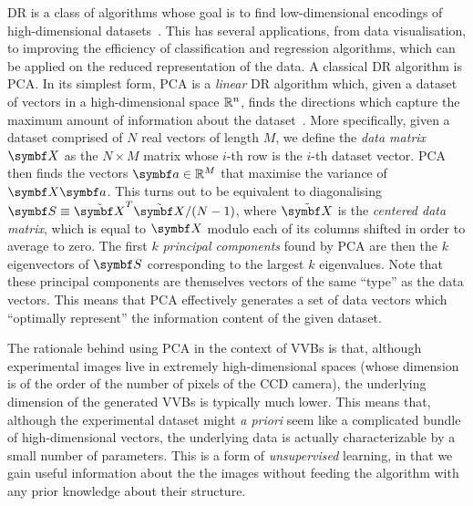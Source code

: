 \acf{DR} is a class of algorithms whose goal is to find low-dimensional encodings of high-dimensional datasets~\cite{cunningham2008dimension,fodor2002survey}.
This has several applications, from data visualisation, to improving the efficiency of classification and regression algorithms, which can be applied on the reduced representation of the data.
A classical \ac{DR} algorithm is \acf{PCA}.
In its simplest form, \ac{PCA} is a \emph{linear} \ac{DR} algorithm which, given a dataset of vectors in a high-dimensional space ${\mathbb{R}}^n$, finds the directions which capture the maximum amount of information about the dataset~\cite{jolliffe2011principal,jolliffe2016principal}.
More specifically, given a dataset comprised of $N$ real vectors of length $M$, we define the \emph{data matrix} $\bs X$ as the $N\times M$ matrix whose $i$-th row is the $i$-th dataset vector. \ac{PCA} then finds the vectors $\bs a\in\RR^{M}$ that maximise the variance of $\bs X\bs a$. This turns out to be equivalent to diagonalising $\bs S\equiv \tilde{\bs X}^T\tilde{\bs X}/(N-1)$, where $\tilde{\bs X}$ is the \emph{centered data matrix}, which is equal to $\bs X$ modulo each of its columns shifted in order to average to zero.
The first $k$ \emph{principal components} found by \ac{PCA} are then the $k$ eigenvectors of $\bs S$ corresponding to the largest $k$ eigenvalues.
Note that these principal components are themselves vectors of the same ``type'' as the data vectors. This means that \ac{PCA} effectively generates a set of data vectors which ``optimally represent'' the information content of the given dataset.

The rationale behind using \ac{PCA} in the context of \acp{VVB} is that, although experimental images live in extremely high-dimensional spaces (whose dimension is of the order of the number of pixels of the \ac{CCD} camera), the underlying dimension of the generated \acp{VVB} is typically much lower.
This means that, although the experimental dataset might \emph{a priori} seem like a complicated bundle of high-dimensional vectors, the underlying data is actually characterizable by a small number of parameters.
This is a form of \emph{unsupervised} learning, in that we gain useful information about the the images without feeding the algorithm with any prior knowledge about their structure.




